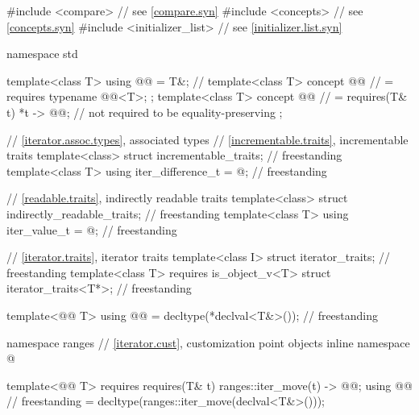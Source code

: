 %
\begin{codeblock}
#include <compare>              // see \ref{compare.syn}
#include <concepts>             // see \ref{concepts.syn}
#include <initializer_list>     // see \ref{initializer.list.syn}

namespace std {
  template<class T> using @@ = T&;  // \expos
  template<class T> concept @@       // \expos
    = requires { typename @@<T>; };
  template<class T> concept @@     // \expos
    = requires(T& t) {
      { *t } -> @@;  // not required to be equality-preserving
    };

  // \ref{iterator.assoc.types}, associated types
  // \ref{incrementable.traits}, incrementable traits
  template<class> struct incrementable_traits;                                      // freestanding
  template<class T>
    using iter_difference_t = @\seebelow@;                                            // freestanding

  // \ref{readable.traits}, indirectly readable traits
  template<class> struct indirectly_readable_traits;                                // freestanding
  template<class T>
    using iter_value_t = @\seebelow@;                                                 // freestanding

  // \ref{iterator.traits}, iterator traits
  template<class I> struct iterator_traits;                                         // freestanding
  template<class T> requires is_object_v<T> struct iterator_traits<T*>;             // freestanding

  template<@@ T>
    using @@ = decltype(*declval<T&>());                              // freestanding

  namespace ranges {
    // \ref{iterator.cust}, customization point objects
    inline namespace @
  }

  template<@@ T>
    requires requires(T& t) {
      { ranges::iter_move(t) } -> @@;
    }
  using @@                                                     // freestanding
    = decltype(ranges::iter_move(declval<T&>()));

}
\end{codeblock}
